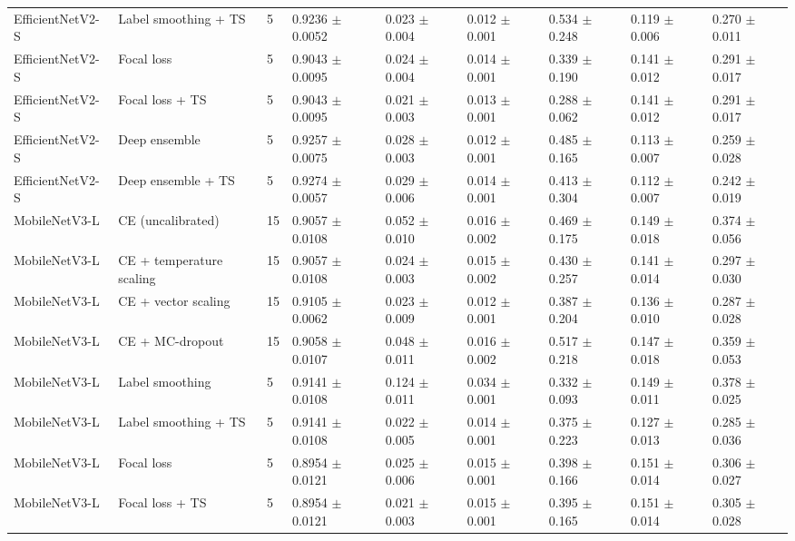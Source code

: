 \begin{table}[ht]
\begin{tabular}{lllllllll}
EfficientNetV2-S & Label smoothing + TS & 5 & 0.9236 $\pm$ 0.0052 & 0.023 $\pm$ 0.004 & 0.012 $\pm$ 0.001 & 0.534 $\pm$ 0.248 & 0.119 $\pm$ 0.006 & 0.270 $\pm$ 0.011 \\
EfficientNetV2-S & Focal loss & 5 & 0.9043 $\pm$ 0.0095 & 0.024 $\pm$ 0.004 & 0.014 $\pm$ 0.001 & 0.339 $\pm$ 0.190 & 0.141 $\pm$ 0.012 & 0.291 $\pm$ 0.017 \\
EfficientNetV2-S & Focal loss + TS & 5 & 0.9043 $\pm$ 0.0095 & 0.021 $\pm$ 0.003 & 0.013 $\pm$ 0.001 & 0.288 $\pm$ 0.062 & 0.141 $\pm$ 0.012 & 0.291 $\pm$ 0.017 \\
EfficientNetV2-S & Deep ensemble & 5 & 0.9257 $\pm$ 0.0075 & 0.028 $\pm$ 0.003 & 0.012 $\pm$ 0.001 & 0.485 $\pm$ 0.165 & 0.113 $\pm$ 0.007 & 0.259 $\pm$ 0.028 \\
EfficientNetV2-S & Deep ensemble + TS & 5 & 0.9274 $\pm$ 0.0057 & 0.029 $\pm$ 0.006 & 0.014 $\pm$ 0.001 & 0.413 $\pm$ 0.304 & 0.112 $\pm$ 0.007 & 0.242 $\pm$ 0.019 \\
MobileNetV3-L & CE (uncalibrated) & 15 & 0.9057 $\pm$ 0.0108 & 0.052 $\pm$ 0.010 & 0.016 $\pm$ 0.002 & 0.469 $\pm$ 0.175 & 0.149 $\pm$ 0.018 & 0.374 $\pm$ 0.056 \\
MobileNetV3-L & CE + temperature scaling & 15 & 0.9057 $\pm$ 0.0108 & 0.024 $\pm$ 0.003 & 0.015 $\pm$ 0.002 & 0.430 $\pm$ 0.257 & 0.141 $\pm$ 0.014 & 0.297 $\pm$ 0.030 \\
MobileNetV3-L & CE + vector scaling & 15 & 0.9105 $\pm$ 0.0062 & 0.023 $\pm$ 0.009 & 0.012 $\pm$ 0.001 & 0.387 $\pm$ 0.204 & 0.136 $\pm$ 0.010 & 0.287 $\pm$ 0.028 \\
MobileNetV3-L & CE + MC-dropout & 15 & 0.9058 $\pm$ 0.0107 & 0.048 $\pm$ 0.011 & 0.016 $\pm$ 0.002 & 0.517 $\pm$ 0.218 & 0.147 $\pm$ 0.018 & 0.359 $\pm$ 0.053 \\
MobileNetV3-L & Label smoothing & 5 & 0.9141 $\pm$ 0.0108 & 0.124 $\pm$ 0.011 & 0.034 $\pm$ 0.001 & 0.332 $\pm$ 0.093 & 0.149 $\pm$ 0.011 & 0.378 $\pm$ 0.025 \\
MobileNetV3-L & Label smoothing + TS & 5 & 0.9141 $\pm$ 0.0108 & 0.022 $\pm$ 0.005 & 0.014 $\pm$ 0.001 & 0.375 $\pm$ 0.223 & 0.127 $\pm$ 0.013 & 0.285 $\pm$ 0.036 \\
MobileNetV3-L & Focal loss & 5 & 0.8954 $\pm$ 0.0121 & 0.025 $\pm$ 0.006 & 0.015 $\pm$ 0.001 & 0.398 $\pm$ 0.166 & 0.151 $\pm$ 0.014 & 0.306 $\pm$ 0.027 \\
MobileNetV3-L & Focal loss + TS & 5 & 0.8954 $\pm$ 0.0121 & 0.021 $\pm$ 0.003 & 0.015 $\pm$ 0.001 & 0.395 $\pm$ 0.165 & 0.151 $\pm$ 0.014 & 0.305 $\pm$ 0.028 \\

\end{tabular}
\end{table}
